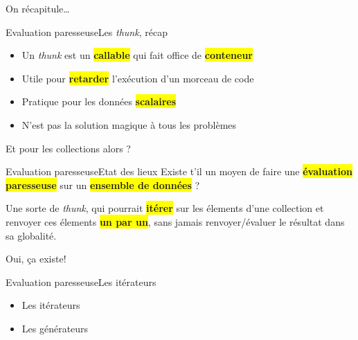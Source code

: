 \begin{frameC}{On récapitule\ldots}

\end{frameC}

\begin{frame}{Evaluation paresseuse}{Les \textit{thunk}, récap}
    \begin{itemize}[<+->]
        \item Un \textit{thunk} est un \colorbox{yellow}{\textbf{callable}} qui fait office de \colorbox{yellow}{\textbf{conteneur}}

        \item Utile pour \colorbox{yellow}{\textbf{retarder}} l'exécution d'un morceau de code

        \item Pratique pour les données \colorbox{yellow}{\textbf{scalaires}}

        \item N'est pas la solution magique à tous les problèmes
    \end{itemize}
\end{frame}

\begin{frameC}{Et pour les collections alors ?}

\end{frameC}

\begin{frame}{Evaluation paresseuse}{Etat des lieux}
    Existe t'il un moyen de faire une \colorbox{yellow}{\textbf{évaluation paresseuse}} sur un \colorbox{yellow}{\textbf{ensemble de
    données}} ?

    \pause
    \bigskip

    Une sorte de \textit{thunk}, qui pourrait \colorbox{yellow}{\textbf{itérer}}
    sur les élements d'une collection et renvoyer ces élements
    \colorbox{yellow}{\textbf{un par un}}, sans jamais renvoyer/évaluer le
    résultat dans sa globalité.
\end{frame}

\begin{frameC}{Oui, ça existe!}

\end{frameC}

\begin{frame}{Evaluation paresseuse}{Les itérateurs}
    \begin{itemize}[<+->]
        \item Les itérateurs
        \item Les générateurs
    \end{itemize}
\end{frame}

